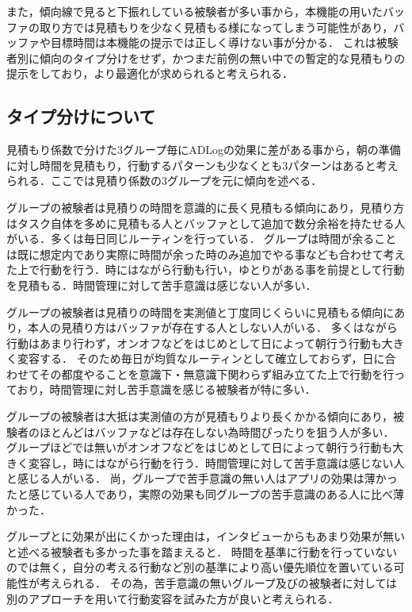 また，傾向線で見ると下振れしている被験者が多い事から，本機能の用いたバッファの取り方では見積もりを少なく見積もる様になってしまう可能性があり，バッファや目標時間は本機能の提示では正しく導けない事が分かる．
これは被験者別に傾向のタイプ分けをせず，かつまだ前例の無い中での暫定的な見積もりの提示をしており，より最適化が求められると考えられる．

\subsection{タイプ分けについて}
見積もり係数で分けた3グループ毎にADLogの効果に差がある事から，朝の準備に対し時間を見積もり，行動するパターンも少なくとも3パターンはあると考えられる．ここでは見積り係数の3グループを元に傾向を述べる．

グループの被験者は見積りの時間を意識的に長く見積もる傾向にあり，見積り方はタスク自体を多めに見積もる人とバッファとして追加で数分余裕を持たせる人がいる．多くは毎日同じルーティンを行っている．
グループは時間が余ることは既に想定内であり実際に時間が余った時のみ追加でやる事なども合わせて考えた上で行動を行う．時にはながら行動も行い，ゆとりがある事を前提として行動を見積もる．時間管理に対して苦手意識は感じない人が多い．

グループの被験者は見積りの時間を実測値と丁度同じくらいに見積もる傾向にあり，本人の見積り方はバッファが存在する人としない人がいる．
多くはながら行動はあまり行わず，オンオフなどをはじめとして日によって朝行う行動も大きく変容する．
そのため毎日が均質なルーティンとして確立しておらず，日に合わせてその都度やることを意識下・無意識下関わらず組み立てた上で行動を行っており，時間管理に対し苦手意識を感じる被験者が特に多い．

グループの被験者は大抵は実測値の方が見積もりより長くかかる傾向にあり，被験者のほとんどはバッファなどは存在しない為時間ぴったりを狙う人が多い．
グループほどでは無いがオンオフなどをはじめとして日によって朝行う行動も大きく変容し，時にはながら行動を行う．時間管理に対して苦手意識は感じない人と感じる人がいる．
尚，グループで苦手意識の無い人はアプリの効果は薄かったと感じている人であり，実際の効果も同グループの苦手意識のある人に比べ薄かった．

グループとに効果が出にくかった理由は，インタビューからもあまり効果が無いと述べる被験者も多かった事を踏まえると．
時間を基準に行動を行っていないのでは無く，自分の考える行動など別の基準により高い優先順位を置いている可能性が考えられる．
その為，苦手意識の無いグループ及びの被験者に対しては別のアプローチを用いて行動変容を試みた方が良いと考えられる．
